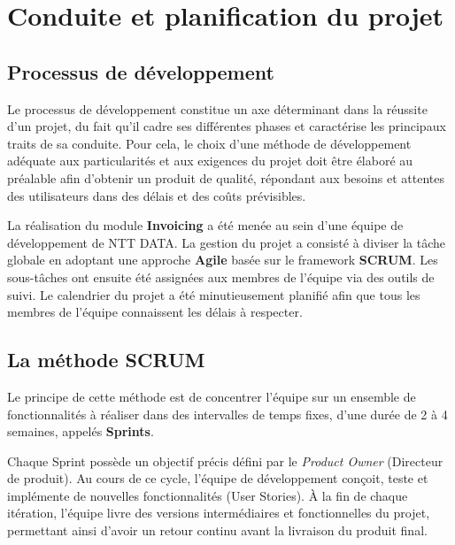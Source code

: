 \documentclass[12pt, a4paper, openany]{report}
\begin{document}
\section{Conduite et planification du projet}

\vspace{-0.5cm}
\subsection{Processus de développement}

\vspace{-0.3cm}
Le processus de développement constitue un axe déterminant dans la réussite d'un projet, du fait qu'il cadre ses différentes phases et caractérise les principaux traits de sa conduite. Pour cela, le choix d'une méthode de développement adéquate aux particularités et aux exigences du projet doit être élaboré au préalable afin d'obtenir un produit de qualité, répondant aux besoins et attentes des utilisateurs dans des délais et des coûts prévisibles.

La réalisation du module \textbf{Invoicing} a été menée au sein d'une équipe de développement de NTT DATA. La gestion du projet a consisté à diviser la tâche globale en adoptant une approche \textbf{Agile} basée sur le framework \textbf{SCRUM}. Les sous-tâches ont ensuite été assignées aux membres de l'équipe via des outils de suivi. Le calendrier du projet a été minutieusement planifié afin que tous les membres de l'équipe connaissent les délais à respecter.

\vspace{-0.4cm}

\subsection{La méthode SCRUM}

\vspace{-0.3cm}
Le principe de cette méthode est de concentrer l'équipe sur un ensemble de fonctionnalités à réaliser dans des intervalles de temps fixes, d'une durée de 2 à 4 semaines, appelés \textbf{Sprints}. 

Chaque Sprint possède un objectif précis défini par le \textit{Product Owner} (Directeur de produit). Au cours de ce cycle, l'équipe de développement conçoit, teste et implémente de nouvelles fonctionnalités (User Stories). À la fin de chaque itération, l'équipe livre des versions intermédiaires et fonctionnelles du projet, permettant ainsi d'avoir un retour continu avant la livraison du produit final. \cite{scrum_guide}
\end{document}
